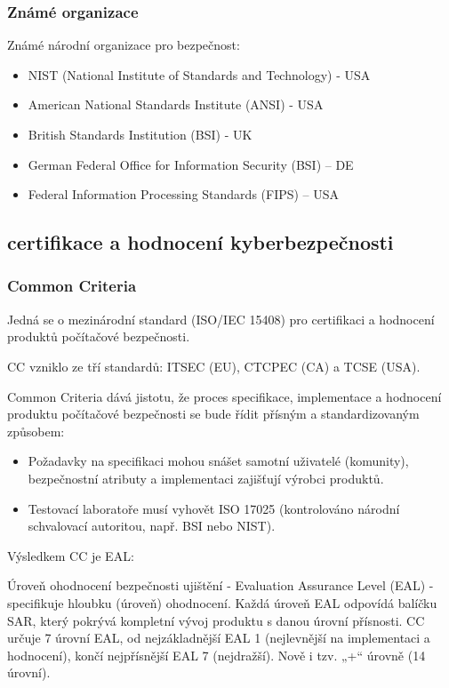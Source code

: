 \subsubsection{Známé organizace}
Známé národní organizace pro bezpečnost:
\begin{itemize}
    \item NIST (National Institute of Standards and Technology) - USA
    \item American National Standards Institute (ANSI) - USA
    \item British Standards Institution (BSI) - UK
    \item German Federal Office for Information Security (BSI) – DE
    \item Federal Information Processing Standards (FIPS) – USA
\end{itemize}

\subsection{certifikace a hodnocení kyberbezpečnosti}

\subsubsection{Common Criteria}
Jedná se o mezinárodní standard (ISO/IEC 15408) pro certifikaci a hodnocení produktů počítačové bezpečnosti.


CC vzniklo ze tří standardů: ITSEC (EU), CTCPEC (CA) a TCSE (USA).

Common Criteria dává jistotu, že proces specifikace, implementace a hodnocení produktu počítačové bezpečnosti se bude řídit přísným a standardizovaným způsobem:
\begin{itemize}
    \item Požadavky na specifikaci mohou snášet samotní uživatelé (komunity), bezpečnostní atributy a implementaci zajišťují výrobci produktů.
    \item Testovací laboratoře musí vyhovět ISO 17025 (kontrolováno národní schvalovací autoritou, např. BSI nebo NIST).
\end{itemize}

Výsledkem CC je EAL:

Úroveň ohodnocení bezpečnosti ujištění - Evaluation Assurance Level (EAL) - specifikuje hloubku (úroveň) ohodnocení. Každá úroveň EAL odpovídá balíčku SAR, který pokrývá kompletní vývoj produktu s danou úrovní přísnosti. CC určuje 7 úrovní EAL, od nejzákladnější EAL 1 (nejlevnější na implementaci a hodnocení), končí nejpřísnější EAL 7 (nejdražší). Nově i tzv. „+“ úrovně (14 úrovní).
    
